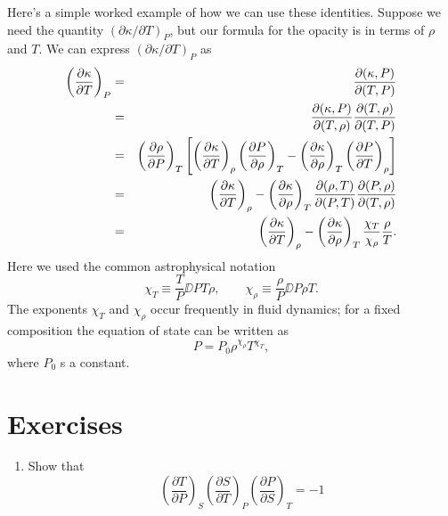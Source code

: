 Here's a simple worked example of how we can use these identities.  Suppose we need the quantity $(\partial \kappa/\partial T)_{P}$, but our formula for the opacity is in terms of $\rho$ and $T$. We can express $(\partial\kappa/\partial T)_{P}$ as
\begin{eqnarray}
\left(\frac{\partial \kappa}{\partial T}\right)_{P} &=& \frac{\partial(\kappa,P)}{\partial(T,P)}\nonumber\\
 &=& \frac{\partial(\kappa,P)}{\partial(T,\rho)}\frac{\partial(T,\rho)}{\partial(T,P)}\nonumber\\
 &=& \left(\frac{\partial \rho}{\partial P}\right)_{T}\left[\left(\frac{\partial \kappa}{\partial T}\right)_{\rho}\left(\frac{\partial P}{\partial \rho}\right)_{T}-\left(\frac{\partial \kappa}{\partial \rho}\right)_{T}\left(\frac{\partial P}{\partial T}\right)_{\rho}\right]
 \nonumber\\
 &=& \left(\frac{\partial \kappa}{\partial T}\right)_{\rho} - \left(\frac{\partial \kappa}{\partial \rho}\right)_{T}\frac{\partial(\rho,T)}{\partial(P,T)}\frac{\partial(P,\rho)}{\partial(T,\rho)}\nonumber\\
 &=& \left(\frac{\partial \kappa}{\partial T}\right)_{\rho} - \left(\frac{\partial \kappa}{\partial \rho}\right)_{T} \frac{\chi_{T}}{\chi_{\rho}}\frac{\rho}{T}.
\end{eqnarray}
Here we used the common astrophysical notation
\begin{equation}
\chi_{T}\equiv\frac{T}{P}\DD{P}{T}{\rho},\qquad\chi_{\rho}\equiv\frac{\rho}{P}\DD{P}{\rho}{T}.
\end{equation}
The exponents $\chi_{T}$ and $\chi_{\rho}$ occur frequently in fluid dynamics; for a fixed composition the equation of state can be written as
\begin{equation}\label{e.eos}
P = P_{0}\rho^{\chi_{\rho}}T^{\chi_{T}},
\end{equation}
where $P_{0}$ s a constant.

\section{Exercises}\label{s.thermo-exercises}
\begin{enumerate}
\item Show that 
\[
 	\left(\frac{\partial T}{\partial P}\right)_{S} 
 	\left(\frac{\partial S}{\partial T}\right)_{P} 
 	\left(\frac{\partial P}{\partial S}\right)_{T} = -1
\]
\end{enumerate}
